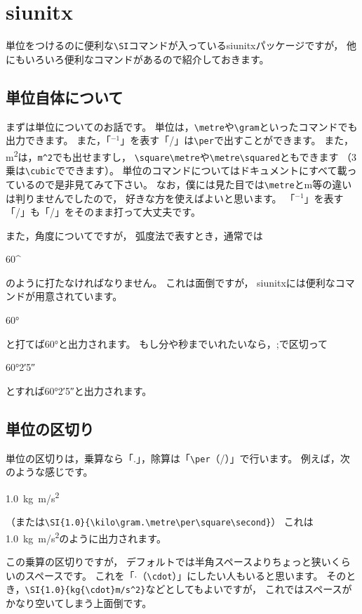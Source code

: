 \section{siunitx}
単位をつけるのに便利な\verb|\SI|コマンドが入っているsiunitxパッケージですが，
他にもいろいろ便利なコマンドがあるので紹介しておきます。


\subsection{単位自体について}
まずは単位についてのお話です。
単位は，\verb|\metre|や\verb|\gram|といったコマンドでも出力できます。
また，「${}^{-1}$」を表す「/」は\verb|\per|で出すことができます。
また，\si{\square\metre}は，\verb|m^2|でも出せますし，
\verb|\square\metre|や\verb|\metre\squared|ともできます
（3乗は\verb|\cubic|でできます）。
単位のコマンドについてはドキュメントにすべて載っているので是非見てみて下さい。
なお，僕には見た目では\verb|\metre|とm等の違いは判りませんでしたので，
好きな方を使えばよいと思います。
「${}^{-1}$」を表す「/」も「/」をそのまま打って大丈夫です。

また，角度についてですが，
弧度法で表すとき，通常では
\begin{ITeX}
60^{\circ}
\end{ITeX}
のように打たなければなりません。
これは面倒ですが，
siunitxには便利なコマンドが用意されています。
\begin{ITeX}
\ang{60}
\end{ITeX}
と打てば\ang{60}と出力されます。
もし分や秒までいれたいなら，;で区切って
\begin{ITeX}
\ang{60;2;5}
\end{ITeX}
とすれば\ang{60;2;5}と出力されます。


\subsection{単位の区切り}
単位の区切りは，乗算なら「.」，除算は「\verb|\per|（/）」で行います。
例えば，次のような感じです。
\begin{ITeX}
\SI{1.0}{kg.m/s^2}
\end{ITeX}
（または\verb|\SI{1.0}{\kilo\gram.\metre\per\square\second}|）
これは\SI{1.0}{kg.m/s^2}のように出力されます。

この乗算の区切りですが，
デフォルトでは半角スペースよりちょっと狭いくらいのスペースです。
これを「$\cdot$（\verb|\cdot|）」にしたい人もいると思います。
そのとき，\verb|\SI{1.0}{kg{\cdot}m/s^2}|などとしてもよいですが，
これではスペースがかなり空いてしまう上面倒です。

